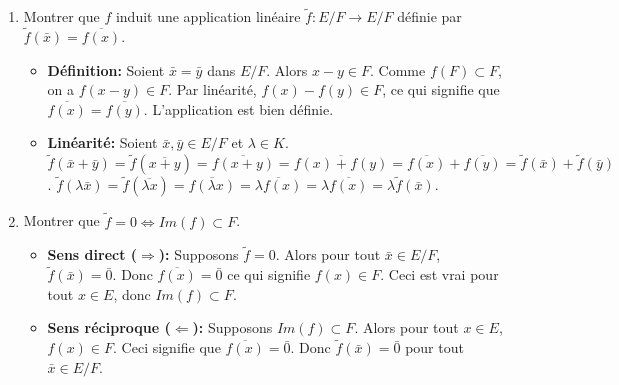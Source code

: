 \documentclass[french]{yLectureNote}
\begin{document}
\begin{enumerate}
    \item Montrer que $f$ induit une application linéaire $\tilde{f}: E/F \rightarrow E/F$ définie par $\tilde{f}(\bar{x}) = \overline{f(x)}$.
    \begin{itemize}
        \item \textbf{Définition:} Soient $\bar{x}=\bar{y}$ dans $E/F$. Alors $x-y \in F$. Comme $f(F)\subset F$, on a $f(x-y) \in F$. Par linéarité, $f(x)-f(y) \in F$, ce qui signifie que $\overline{f(x)}=\overline{f(y)}$. L'application est bien définie.
        \item \textbf{Linéarité:} Soient $\bar{x}, \bar{y} \in E/F$ et $\lambda \in K$.
        $\tilde{f}(\bar{x}+\bar{y}) = \tilde{f}(\overline{x+y}) = \overline{f(x+y)} = \overline{f(x)+f(y)} = \overline{f(x)}+\overline{f(y)} = \tilde{f}(\bar{x})+\tilde{f}(\bar{y})$.
        $\tilde{f}(\lambda\bar{x}) = \tilde{f}(\overline{\lambda x}) = \overline{f(\lambda x)} = \overline{\lambda f(x)} = \lambda\overline{f(x)} = \lambda\tilde{f}(\bar{x})$.
    \end{itemize}

    \item Montrer que $\tilde{f} = 0 \iff Im(f) \subset F$.
    \begin{itemize}
        \item \textbf{Sens direct ($\Rightarrow$):} Supposons $\tilde{f}=0$. Alors pour tout $\bar{x}\in E/F$, $\tilde{f}(\bar{x})=\bar{0}$. Donc $\overline{f(x)}=\bar{0}$ ce qui signifie $f(x) \in F$. Ceci est vrai pour tout $x \in E$, donc $Im(f)\subset F$.
        \item \textbf{Sens réciproque ($\Leftarrow$):} Supposons $Im(f)\subset F$. Alors pour tout $x \in E$, $f(x) \in F$. Ceci signifie que $\overline{f(x)}=\bar{0}$. Donc $\tilde{f}(\bar{x})=\bar{0}$ pour tout $\bar{x} \in E/F$.
    \end{itemize}

\end{enumerate}
\end{document}
